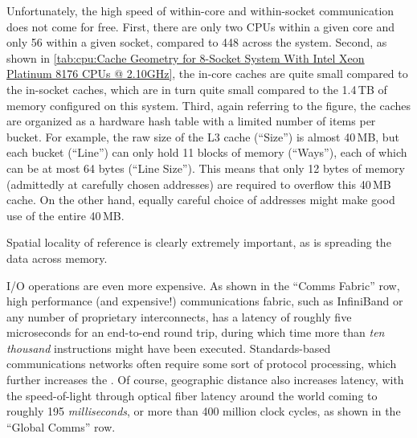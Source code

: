 Unfortunately, the high speed of within-core and within-socket communication
does not come for free.
First, there are only two CPUs within a given core and only 56 within
a given socket, compared to 448 across the system.
Second, as shown in
\cref{tab:cpu:Cache Geometry for 8-Socket System With Intel Xeon Platinum 8176 CPUs @ 2.10GHz},
the in-core caches are quite small compared to the in-socket caches, which
are in turn quite small compared to the 1.4\,TB of memory configured on
this system.
Third, again referring to the figure, the caches are organized as
a hardware hash table with a limited number of items per bucket.
For example, the raw size of the L3 cache (``Size'') is almost 40\,MB, but each
bucket (``Line'') can only hold 11 blocks of memory (``Ways''), each
of which can be at most 64 bytes (``Line Size'').
This means that only 12 bytes of memory (admittedly at carefully chosen
addresses) are required to overflow this 40\,MB cache.
On the other hand, equally careful choice of addresses might make good
use of the entire 40\,MB.

Spatial locality of reference is clearly extremely important, as is
spreading the data across memory.

I/O operations are even more expensive.
As shown in the ``Comms Fabric'' row,
high performance (and expensive!\@) communications fabric, such as
InfiniBand or any number of proprietary interconnects, has a latency
of roughly five microseconds for an end-to-end round trip, during which
time more than \emph{ten thousand} instructions might have been executed.
Standards-based communications networks often require some sort of
protocol processing, which further increases the .
Of course, geographic distance also increases latency, with the
speed-of-light through optical fiber latency around the world coming to
roughly 195 \emph{milliseconds}, or more than 400 million clock
cycles, as shown in the ``Global Comms'' row.


